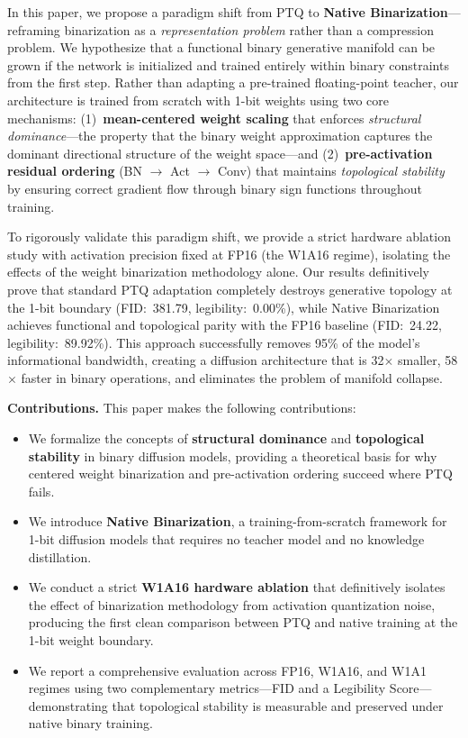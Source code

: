 \documentclass[conference]{IEEEtran}
\begin{document}
In this paper, we propose a paradigm shift from PTQ to \textbf{Native Binarization}---
reframing binarization as a \emph{representation problem} rather than a compression
problem. We hypothesize that a functional binary generative manifold can be grown if the
network is initialized and trained entirely within binary constraints from the first step.
Rather than adapting a pre-trained floating-point teacher, our architecture is trained
from scratch with 1-bit weights using two core mechanisms: (1)~\textbf{mean-centered
weight scaling} that enforces \emph{structural dominance}---the property that the binary
weight approximation captures the dominant directional structure of the weight space---and
(2)~\textbf{pre-activation residual ordering} (BN $\to$ Act $\to$ Conv) that maintains
\emph{topological stability} by ensuring correct gradient flow through binary sign
functions throughout training.

To rigorously validate this paradigm shift, we provide a strict hardware ablation study
with activation precision fixed at FP16 (the W1A16 regime), isolating the effects of the
weight binarization methodology alone. Our results definitively prove that standard PTQ
adaptation completely destroys generative topology at the 1-bit boundary
(FID:~381.79, legibility:~0.00\%), while Native Binarization achieves functional and
topological parity with the FP16 baseline (FID:~24.22, legibility:~89.92\%). This
approach successfully removes 95\% of the model's informational bandwidth, creating a
diffusion architecture that is 32$\times$ smaller, 58$\times$ faster in binary
operations, and eliminates the problem of manifold collapse.

\textbf{Contributions.} This paper makes the following contributions:
\begin{itemize}
  \item We formalize the concepts of \textbf{structural dominance} and
    \textbf{topological stability} in binary diffusion models, providing a theoretical
    basis for why centered weight binarization and pre-activation ordering succeed where
    PTQ fails.
  \item We introduce \textbf{Native Binarization}, a training-from-scratch framework for
    1-bit diffusion models that requires no teacher model and no knowledge distillation.
  \item We conduct a strict \textbf{W1A16 hardware ablation} that definitively isolates
    the effect of binarization methodology from activation quantization noise, producing
    the first clean comparison between PTQ and native training at the 1-bit weight
    boundary.
  \item We report a comprehensive evaluation across FP16, W1A16, and W1A1 regimes using
    two complementary metrics---FID and a Legibility Score---demonstrating that
    topological stability is measurable and preserved under native binary training.
\end{itemize}
\end{document}
